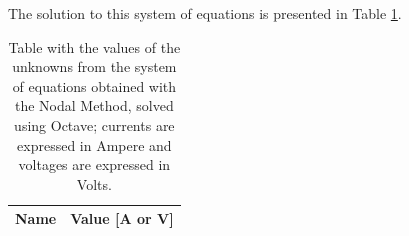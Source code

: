 The solution to this system of equations is presented in Table \ref{tab:nodal}. 


\begin{table}[h]
  \centering
  \begin{tabular}{|l|r|}
    \hline    
    {\bf Name} & {\bf Value [A or V]} \\ \hline
    
  \end{tabular}
  \caption{Table with the values of the unknowns from the system of equations obtained with the Nodal Method, solved using Octave; currents are expressed in Ampere and voltages are expressed in Volts.}
  \label{tab:nodal}
\end{table}




